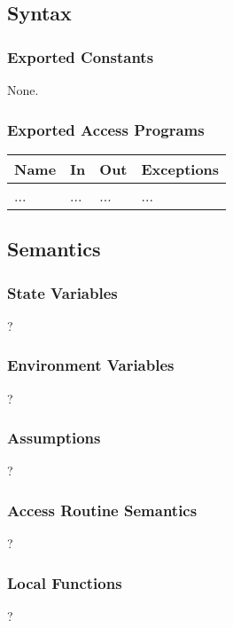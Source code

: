 \documentclass[12pt, titlepage]{article}
\begin{document}
\subsection{Syntax}

\subsubsection{Exported Constants}
None.

\subsubsection{Exported Access Programs}

\begin{center}
\begin{tabular}{p{2cm} p{5cm} p{3cm} p{4cm}}
\hline
\textbf{Name} & \textbf{In} & \textbf{Out} & \textbf{Exceptions} \\
\hline
... & ... & ... & ... \\
\hline
\end{tabular}
\end{center}

\subsection{Semantics}

\subsubsection{State Variables}
?

\subsubsection{Environment Variables}
?

\subsubsection{Assumptions}
?

\subsubsection{Access Routine Semantics}
?

\subsubsection{Local Functions}
?


\newpage
\end{document}
